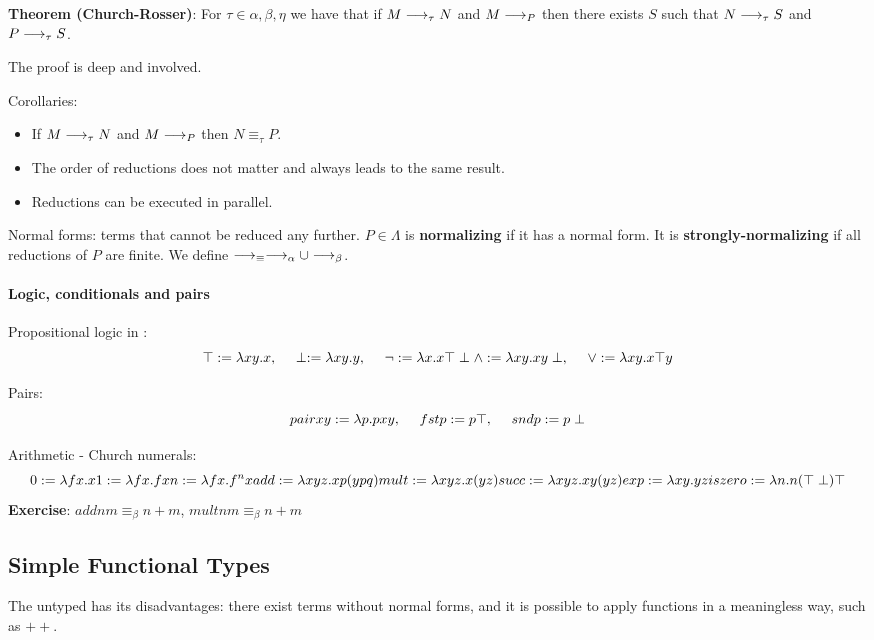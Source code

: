 \textbf{Theorem (Church-Rosser)}: For $\tau\in{\alpha, \beta, \eta}$ we have that if $M \longrightarrow_\tau N$ and $M \longrightarrow_P$ then
there exists $S$ such that $N \longrightarrow_\tau S$ and $P \longrightarrow_\tau S$.

The proof is deep and involved.

Corollaries:
\begin{itemize}
\item If $M \longrightarrow_\tau N$ and $M \longrightarrow_P$ then $N \equiv_\tau P$.
\item The order of reductions does not matter and always leads to the same result.
\item Reductions can be executed in parallel.
\end{itemize}

Normal forms: \lc terms that cannot be reduced any further. $P\in\Lambda$ is \textbf{normalizing} if it has a normal form. 
It is \textbf{strongly-normalizing} if all reductions of $P$ are finite. 
We define $\longrightarrow_\equiv \longrightarrow_\alpha \cup \longrightarrow_\beta$.


\paragraph{Logic, conditionals and pairs}

Propositional logic in \lc:
\[
\top := \lambda xy. x,~~~~\perp := \lambda xy.y,~~~~\neg := \lambda x. x \top \perp
\wedge := \lambda xy. xy\perp,~~~~\vee := \lambda xy. x\top y
\]

Pairs:
\[
pair x y := \lambda p. p x y,~~~~fst p := p \top,~~~~snd p := p \perp
\]

Arithmetic - Church numerals:
\[
0 := \lambda fx. x
1 := \lambda fx. fx
n := \lambda fx. f^n x
add := \lambda xyz. xp (ypq)
mult := \lambda xyz. x (yz)
succ := \lambda xyz. xy(yz)
exp := \lambda xy. yz
iszero := \lambda n. n (\top \perp) \top
\]
\textbf{Exercise}: $add n m \equiv_\beta n + m$, $mult n m \equiv_\beta n + m$

\subsection{Simple Functional Types}
The untyped \lc has its disadvantages: there exist terms without normal forms, and it is possible
to apply functions in a meaningless way, such as $+ +$. 

